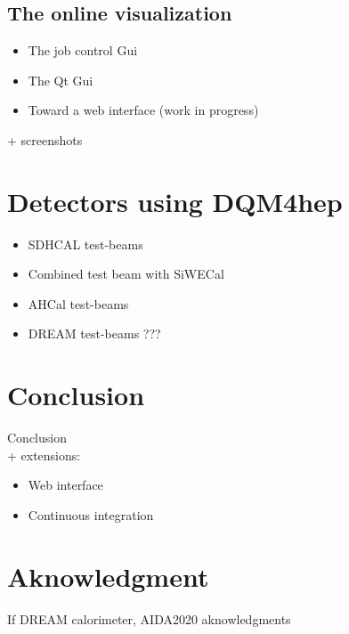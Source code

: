 \documentclass{webofc}
\begin{document}
\subsection{The online visualization}
\label{subsec:vis}

\begin{itemize}
  \item The job control Gui
  \item The Qt Gui
  \item Toward a web interface (work in progress)
\end{itemize}

+ screenshots

\section{Detectors using DQM4hep}
\label{sec:detectors}

\begin{itemize}
  \item SDHCAL test-beams
  \item Combined test beam with SiWECal
  \item AHCal test-beams
  \item DREAM test-beams ???
\end{itemize}

\section{Conclusion}
\label{sec:conclusion}

Conclusion \\
+ extensions:

\begin{itemize}
  \item Web interface
  \item Continuous integration
\end{itemize}

\section{Aknowledgment}
\label{sec:aknowledgment}

If DREAM calorimeter, AIDA2020 aknowledgments
\end{document}
